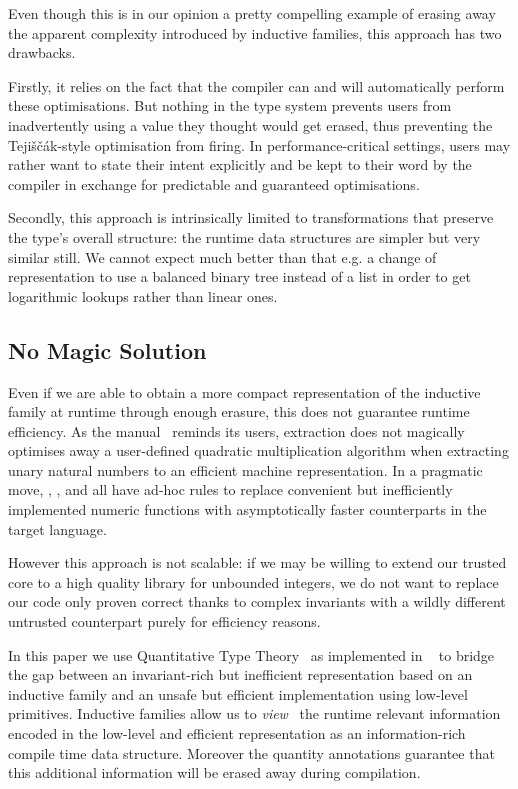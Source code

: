 
Even though this is in our opinion a pretty compelling example of erasing away the
apparent complexity introduced by inductive families, this approach has two drawbacks.

Firstly, it relies on the fact that the compiler can and will automatically perform
these optimisations.
%
But nothing in the type system prevents users from inadvertently using a value they
thought would get erased, thus preventing the Tejiščák-style optimisation from firing.
%
In performance-critical settings, users may rather want to state their intent
explicitly and be kept to their word by the compiler in exchange for predictable
and guaranteed optimisations.

Secondly, this approach is intrinsically limited to transformations that preserve the
type's overall structure: the runtime data structures are simpler but very similar still.
%
We cannot expect much better than that e.g. a change of representation to use a
balanced binary tree instead of a list in order to get logarithmic lookups rather
than linear ones.

\subsection{No Magic Solution}

Even if we are able to obtain a more compact representation of the inductive
family at runtime through enough erasure, this does not guarantee runtime efficiency.
As the \coq{} manual~\cite{Coq:manual} reminds its users, extraction does not magically
optimises away a user-defined quadratic multiplication algorithm when extracting unary
natural numbers to an efficient machine representation.
%
In a pragmatic move, \coq{}, \agda{}, and \idris{} all have ad-hoc rules to replace
convenient but inefficiently implemented numeric functions with asymptotically faster
counterparts in the target language.

However this approach is not scalable: if we may be willing to extend our trusted core to a
high quality library for unbounded integers, we do not want to replace
our code only proven correct thanks to complex invariants with a wildly different
untrusted counterpart purely for efficiency reasons.

In this paper we use Quantitative Type
Theory~\cite{DBLP:conf/birthday/McBride16,DBLP:conf/lics/Atkey18}
as implemented in \idris{}~\cite{DBLP:conf/ecoop/Brady21} to bridge the gap between
an invariant-rich but inefficient representation based on an inductive family and
an unsafe but efficient implementation using low-level primitives.
%
Inductive families allow us to
\emph{view}~\cite{DBLP:conf/popl/Wadler87,DBLP:journals/jfp/McBrideM04}
the runtime relevant information encoded in the low-level and efficient representation
as an information-rich compile time data structure. Moreover the quantity annotations
guarantee that this additional information will be erased away during compilation.
